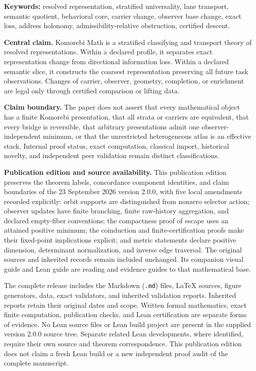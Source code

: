 \documentclass[11pt]{article}
\theoremstyle{definition}
\theoremstyle{remark}
\begin{document}
\begin{center}
\small\textbf{Keywords:} resolved representation, stratified universality, lane transport, semantic quotient, behavioral core, carrier change, observer base change, exact loss, address holonomy, admissibility-relative obstruction, certified descent.
\end{center}

\begin{claimbox}
\textbf{Central claim.}
Komorebi Math is a stratified classifying and transport theory of resolved representations. Within a declared profile, it separates exact representation change from directional information loss. Within a declared semantic slice, it constructs the coarsest representation preserving all future task observations. Changes of carrier, observer, geometry, completion, or enrichment are legal only through certified comparison or lifting data.
\end{claimbox}

\begin{boundarybox}
\textbf{Claim boundary.}
The paper does not assert that every mathematical object has a finite Komorebi presentation, that all strata or carriers are equivalent, that every bridge is reversible, that arbitrary presentations admit one observer-independent minimum, or that the unrestricted heterogeneous atlas is an effective stack. Internal proof status, exact computation, classical import, historical novelty, and independent peer validation remain distinct classifications.
\end{boundarybox}

\clearpage
\begin{claimbox}
\textbf{Publication edition and source availability.}
This publication edition preserves the theorem labels, concordance component identities, and claim boundaries of the 23 September 2026 version 2.0.0, with five local amendments recorded explicitly: orbit supports are distinguished from nonzero selector action; observer updates have finite branching, finite raw-history aggregation, and declared empty-fiber conventions; the compactness proof of escape uses an attained positive minimum; the coinduction and finite-certification proofs make their fixed-point implications explicit; and metric statements declare positive dimension, determinant normalization, and inverse edge traversal. The original sources and inherited records remain included unchanged. Its companion visual guide and Lean guide are reading and evidence guides to that mathematical base.

The complete release includes the Markdown (\texttt{.md}) files, \LaTeX{} sources, figure generators, data, exact validators, and inherited validation reports. Inherited reports retain their original dates and scope. Written formal mathematics, exact finite computation, publication checks, and Lean certification are separate forms of evidence. No Lean source files or Lean build project are present in the supplied version 2.0.0 source tree. Separate related Lean developments, where identified, require their own source and theorem correspondence. This publication edition does not claim a fresh Lean build or a new independent proof audit of the complete manuscript.
\end{claimbox}
\clearpage
\end{document}

